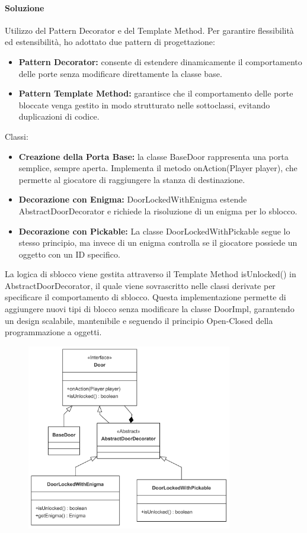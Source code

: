 \documentclass[a4paper,12pt]{report}
\begin{document}
\paragraph{Soluzione} %
Utilizzo del Pattern Decorator e del Template Method.
Per garantire flessibilità ed estensibilità, ho adottato due pattern di progettazione:
\begin{itemize}
	\item \textbf{Pattern Decorator:} consente di estendere dinamicamente il comportamento delle porte senza modificare direttamente la classe base.
	\item \textbf{Pattern Template Method:} garantisce che il comportamento delle porte bloccate venga gestito in modo strutturato nelle sottoclassi, evitando duplicazioni di codice.
\end{itemize}
Classi:
\begin{itemize}
	\item \textbf{Creazione della Porta Base:} la classe BaseDoor rappresenta una porta semplice, sempre aperta. Implementa il metodo onAction(Player player), che permette al giocatore di raggiungere la stanza di destinazione.
	\item \textbf{Decorazione con Enigma:} DoorLockedWithEnigma estende AbstractDoorDecorator e richiede la risoluzione di un enigma per lo sblocco.
	\item \textbf{Decorazione con Pickable:} La classe DoorLockedWithPickable segue lo stesso principio, ma invece di un enigma controlla se il giocatore possiede un oggetto con un ID specifico.
\end{itemize}
La logica di sblocco viene gestita attraverso il Template Method isUnlocked() in AbstractDoorDecorator, il quale viene sovrascritto nelle classi derivate per specificare il comportamento di sblocco. 
Questa implementazione permette di aggiungere nuovi tipi di blocco senza modificare la classe DoorImpl, garantendo un design scalabile, mantenibile e seguendo il principio Open-Closed della programmazione a oggetti.
\begin{figure}[h]
    \centering
    \includegraphics[width=0.8\textwidth]{img/doors.png}
    \label{img:doors}
\end{figure}
\end{document}
